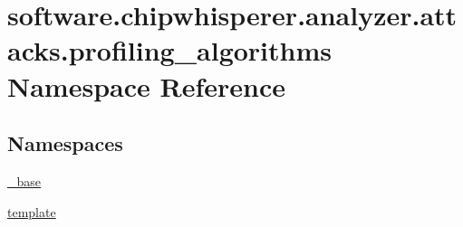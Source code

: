 \hypertarget{namespacesoftware_1_1chipwhisperer_1_1analyzer_1_1attacks_1_1profiling__algorithms}{}\section{software.\+chipwhisperer.\+analyzer.\+attacks.\+profiling\+\_\+algorithms Namespace Reference}
\label{namespacesoftware_1_1chipwhisperer_1_1analyzer_1_1attacks_1_1profiling__algorithms}
\subsection*{Namespaces}
\begin{DoxyCompactItemize}
\item 
 \hyperlink{namespacesoftware_1_1chipwhisperer_1_1analyzer_1_1attacks_1_1profiling__algorithms_1_1__base}{\+\_\+base}
\item 
 \hyperlink{namespacesoftware_1_1chipwhisperer_1_1analyzer_1_1attacks_1_1profiling__algorithms_1_1template}{template}
\end{DoxyCompactItemize}
